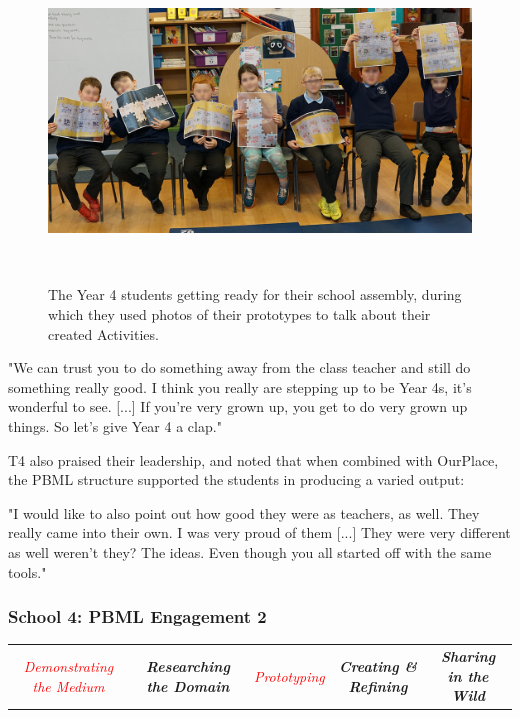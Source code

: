 \begin{figure}
\centering
  \includegraphics[width=0.8\columnwidth]{images/chapter08/assembly.jpg}
  \caption[Year 4 students hosting a school assembly to talk about their Activities]{The Year 4 students getting ready for their school assembly, during which they used photos of their prototypes to talk about their created Activities.}~\label{fig:Assembly}
\end{figure}

\begin{displayquote}
"We can trust you to do something away from the class teacher and still do something really good. I think you really are stepping up to be Year 4s, it's wonderful to see. [...] If you're very grown up, you get to do very grown up things. So let's give Year 4 a clap."
\end{displayquote}

T4 also praised their leadership, and noted that when combined with OurPlace, the PBML structure supported the students in producing a varied output:

\begin{displayquote}
"I would like to also point out how good they were as teachers, as well. They really came into their own. I was very proud of them [...] They were very different as well weren't they? The ideas. Even though you all started off with the same tools."
\end{displayquote}

\subsubsection{School 4: PBML Engagement 2}

\begin{table}[h]
    \centering
    \begin{tabulary}{\textwidth}{C|C|p{19mm}|C|C}
    \small\textit{\textcolor{red}{Demonstrating the Medium}} 
    & \small\textit{\textbf{Researching the Domain}}
    & \small\textit{\textcolor{red}{Prototyping}}
    & \small\textit{\textbf{Creating \& Refining}}
    & \small\textit{\textbf{Sharing in the Wild}}\\
\end{tabulary}
\end{table}


